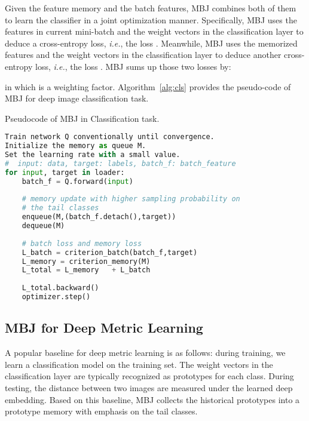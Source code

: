 \documentclass[final]{cvpr}
\def\ie{\textit{i.e.}}
\begin{document}
Given the feature memory and the batch features, MBJ combines both of them to learn the classifier in a joint optimization manner. Specifically, MBJ uses the features in current mini-batch and the weight vectors in the classification layer to deduce a cross-entropy loss, \ie, the loss . Meanwhile, MBJ uses the memorized features and the weight vectors in the classification layer to deduce another cross-entropy loss, \ie, the loss . MBJ sums up those two losses by:
\begin{small}

\end{small}
in which  is a weighting factor. Algorithm~\ref{alg:cls} provides the pseudo-code of MBJ for deep image classification task.

\begin{algorithm}[h]
	\caption{Pseudocode of MBJ in Classification task.}
	\label{alg:cls}
\begin{lstlisting}[mathescape,language=python]  
Train network Q conventionally until convergence.
Initialize the memory as queue M.
Set the learning rate with a small value.
#  input: data, target: labels, batch_f: batch_feature
for input, target in loader:
    batch_f = Q.forward(input) 
		
    # memory update with higher sampling probability on
    # the tail classes
    enqueue(M,(batch_f.detach(),target))
    dequeue(M)
		
    # batch loss and memory loss
    L_batch = criterion_batch(batch_f,target)
    L_memory = criterion_memory(M)
    L_total = L_memory   + L_batch  
    
    L_total.backward()
    optimizer.step()
\end{lstlisting}
\end{algorithm}


\subsection{MBJ for Deep Metric Learning}\label{sec:retrieval}
A popular baseline \cite{softtriple,featurecloud,circleloss,N-pair,HTL,svdnet,pcb} for deep metric learning is as follows: during training, we learn a classification model on the training set. The weight vectors in the classification layer are typically recognized as prototypes for each class. During testing, the distance between two images are measured under the learned deep embedding. 
Based on this baseline, MBJ collects the historical prototypes into a prototype memory with emphasis on the tail classes.
\end{document}
